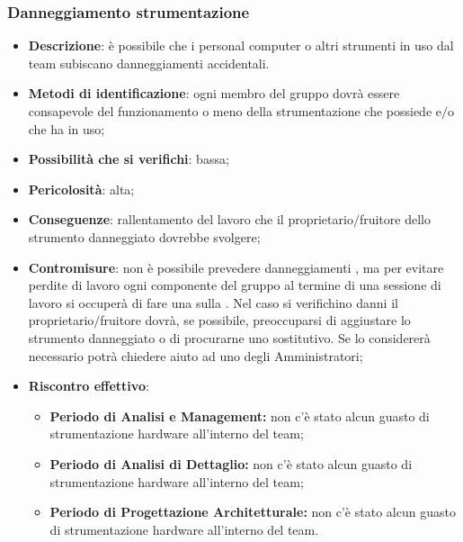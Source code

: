 		\subsubsection{Danneggiamento strumentazione }
			\begin{itemize}
				\item \textbf{Descrizione}: è possibile che i personal computer o altri strumenti in uso dal team subiscano danneggiamenti accidentali.
				\item \textbf{Metodi di identificazione}: ogni membro del gruppo dovrà essere consapevole del funzionamento o meno della strumentazione che possiede e$/$o che ha in uso;
				\item \textbf{Possibilità che si verifichi}: bassa;
				\item \textbf{Pericolosità}: alta;
				\item \textbf{Conseguenze}: rallentamento del lavoro che il proprietario$/$fruitore dello strumento danneggiato dovrebbe svolgere;
				\item \textbf{Contromisure}: non è possibile prevedere danneggiamenti , ma per evitare perdite di lavoro ogni componente del gruppo al termine di una sessione di lavoro si occuperà di fare una  sulla . Nel caso si verifichino danni  il proprietario$/$fruitore dovrà, se possibile, preoccuparsi di aggiustare lo strumento danneggiato o di procurarne uno sostitutivo. Se lo considererà necessario potrà chiedere aiuto ad uno degli Amministratori; 
				\item \textbf{Riscontro effettivo}:
				\begin{itemize}
					\item \textbf{Periodo di Analisi e Management:} non c'è stato alcun guasto di strumentazione hardware all'interno del team;
					\item \textbf{Periodo di Analisi di Dettaglio:} non c'è stato alcun guasto di strumentazione hardware all'interno del team;
					\item \textbf{Periodo di Progettazione Architetturale:} non c'è stato alcun guasto di strumentazione hardware all'interno del team.
				\end{itemize}
			\end{itemize}
		
